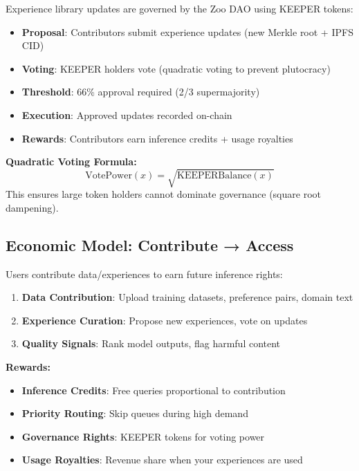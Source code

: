 Experience library updates are governed by the Zoo DAO using KEEPER tokens:

\begin{itemize}
    \item \textbf{Proposal}: Contributors submit experience updates (new Merkle root + IPFS CID)
    \item \textbf{Voting}: KEEPER holders vote (quadratic voting to prevent plutocracy)
    \item \textbf{Threshold}: 66\% approval required (2/3 supermajority)
    \item \textbf{Execution}: Approved updates recorded on-chain
    \item \textbf{Rewards}: Contributors earn inference credits + usage royalties
\end{itemize}

\textbf{Quadratic Voting Formula:}
\begin{equation}
\text{VotePower}(x) = \sqrt{\text{KEEPERBalance}(x)}
\end{equation}
This ensures large token holders cannot dominate governance (square root dampening).

\subsection{Economic Model: Contribute → Access}

Users contribute data/experiences to earn future inference rights:

\begin{enumerate}
    \item \textbf{Data Contribution}: Upload training datasets, preference pairs, domain text
    \item \textbf{Experience Curation}: Propose new experiences, vote on updates
    \item \textbf{Quality Signals}: Rank model outputs, flag harmful content
\end{enumerate}

\textbf{Rewards:}
\begin{itemize}
    \item \textbf{Inference Credits}: Free queries proportional to contribution
    \item \textbf{Priority Routing}: Skip queues during high demand
    \item \textbf{Governance Rights}: KEEPER tokens for voting power
    \item \textbf{Usage Royalties}: Revenue share when your experiences are used
\end{itemize}

